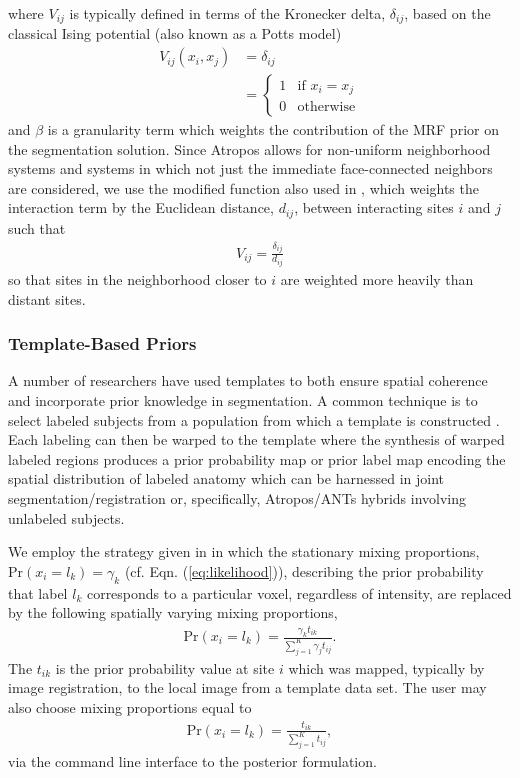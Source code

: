 \documentclass[11pt,english]{article}
\begin{document}
where $V_{ij}$ is typically defined in terms of the Kronecker delta,
$\delta_{ij}$, based on the classical Ising potential (also known as a Potts model) \citep{Besag1974}
\begin{align}
V_{ij}(x_i, x_j) &= \delta_{ij} \nonumber \\
                          &= \left\{
                          \begin{array}{ll}
                            1 & \text{if } x_i = x_j \\
                            0 & \text{otherwise}
                          \end{array}
                         \right.   
\end{align}
and $\beta$ is a granularity term which weights the contribution of the MRF prior on the segmentation solution.
Since Atropos allows for non-uniform neighborhood systems and systems in which not just the immediate face-connected neighbors are considered, we use the modified function also used in \cite{Noe2001}, which weights the interaction term by the Euclidean distance, $d_{ij}$,  between interacting sites $i$ and $j$ such that 
\begin{align}
  V_{ij} = \frac{\delta_{ij}}{d_{ij}}
\end{align}
so that sites in the neighborhood closer to $i$ are weighted more
heavily than distant sites.

\subsubsection{Template-Based Priors}
A number of researchers have used templates to both
ensure spatial coherence and incorporate prior knowledge in
segmentation.  A common technique is to select labeled subjects from a
population from which a template is constructed \citep[e.g.][which is
also available in the ANTs toolkit]{Avants2010}.  Each labeling can
then be warped to the template where the synthesis of warped labeled
regions produces a prior probability map or prior label map encoding
the spatial distribution of labeled anatomy which can be harnessed in
joint segmentation/registration or, specifically, Atropos/ANTs hybrids involving unlabeled subjects.

We employ the strategy given in \cite{Ashburner2005} in which the
stationary mixing proportions, $\mathrm{Pr}(x_i = l_k) = \gamma_k$
(cf. Eqn. (\ref{eq:likelihood})), 
describing the prior probability that label $l_k$ corresponds to a particular voxel, regardless of intensity, are replaced by the following spatially varying mixing proportions,
\begin{align}
\mathrm{Pr}(x_i = l_k) = \frac{\gamma_k t_{ik}}{\sum_{j=1}^K\gamma_j t_{ij}}.
\end{align}
The $t_{ik}$ is the prior probability value at site $i$ which was
mapped, typically by image registration, to the local image
from a template data set.  The user may also
choose mixing proportions equal to
\begin{align}
\mathrm{Pr}(x_i = l_k) = \frac{t_{ik}}{\sum_{j=1}^K t_{ij}},
\end{align}
via the command line interface to the posterior formulation.
\end{document}
